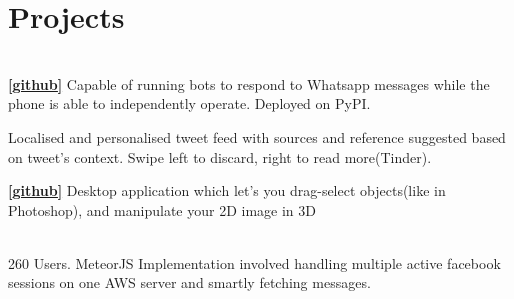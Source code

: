 \documentclass[]{deedy-resume-openfont}
\begin{document}
\begin{minipage}[t]{0.66\textwidth}

\section{Projects}
\\
\textbf{\href{https://github.com/mukulhase/WhatsAPI}{[\underline{github}]}} Capable of running bots to respond to Whatsapp messages while the phone is able to independently operate. Deployed on PyPI.
\sectionsep

Localised and personalised tweet feed with sources and reference suggested based on tweet’s context. Swipe left to discard, right to read more(Tinder).
\sectionsep

\textbf{\href{https://github.com/mukulhase/3-Sweep-Library}{[\underline{github}]}} Desktop application which let's you drag-select objects(like in Photoshop), and manipulate your 2D image in 3D
\sectionsep

 \\
260 Users. MeteorJS Implementation involved handling multiple active facebook sessions on one AWS server and smartly fetching messages.
\sectionsep








\end{minipage}
\end{document}
